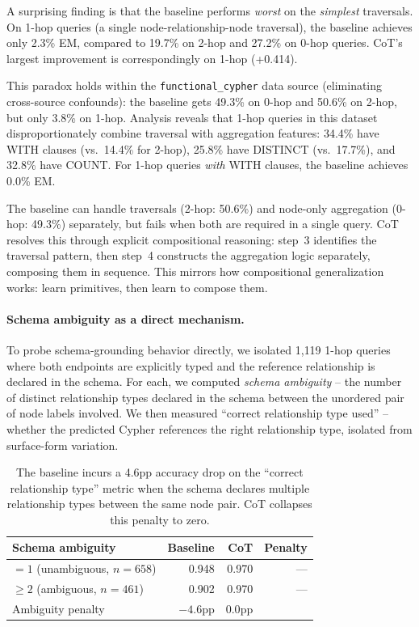 \documentclass[11pt]{article}
\begin{document}
A surprising finding is that the baseline performs \emph{worst} on the \emph{simplest} traversals. On 1-hop queries (a single node-relationship-node traversal), the baseline achieves only 2.3\% EM, compared to 19.7\% on 2-hop and 27.2\% on 0-hop queries. CoT's largest improvement is correspondingly on 1-hop (+0.414).

This paradox holds within the \texttt{functional\_cypher} data source (eliminating cross-source confounds): the baseline gets 49.3\% on 0-hop and 50.6\% on 2-hop, but only 3.8\% on 1-hop. Analysis reveals that 1-hop queries in this dataset disproportionately combine traversal with aggregation features: 34.4\% have WITH clauses (vs.\ 14.4\% for 2-hop), 25.8\% have DISTINCT (vs.\ 17.7\%), and 32.8\% have COUNT. For 1-hop queries \emph{with} WITH clauses, the baseline achieves 0.0\% EM.

The baseline can handle traversals (2-hop: 50.6\%) and node-only aggregation (0-hop: 49.3\%) separately, but fails when both are required in a single query. CoT resolves this through explicit compositional reasoning: step~3 identifies the traversal pattern, then step~4 constructs the aggregation logic separately, composing them in sequence. This mirrors how compositional generalization works: learn primitives, then learn to compose them.

\paragraph{Schema ambiguity as a direct mechanism.} To probe schema-grounding behavior directly, we isolated 1{,}119 1-hop queries where both endpoints are explicitly typed and the reference relationship is declared in the schema. For each, we computed \emph{schema ambiguity} -- the number of distinct relationship types declared in the schema between the unordered pair of node labels involved. We then measured ``correct relationship type used'' -- whether the predicted Cypher references the right relationship type, isolated from surface-form variation.

\begin{table}[h]
\centering
\small
\begin{tabular}{lrrr}
\toprule
\textbf{Schema ambiguity} & \textbf{Baseline} & \textbf{CoT} & \textbf{Penalty} \\
\midrule
$=1$ (unambiguous, $n=658$) & 0.948 & 0.970 & --- \\
$\geq 2$ (ambiguous, $n=461$) & 0.902 & 0.970 & --- \\
\midrule
Ambiguity penalty & $-4.6$pp & $\mathbf{0.0}$pp & \\
\bottomrule
\end{tabular}
\caption{The baseline incurs a 4.6pp accuracy drop on the ``correct relationship type'' metric when the schema declares multiple relationship types between the same node pair. CoT collapses this penalty to zero.}
\label{tab:ambiguity}
\end{table}
\end{document}
